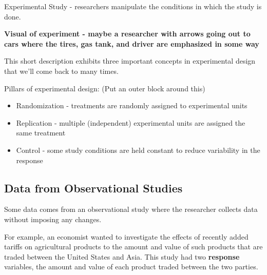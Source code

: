 \documentclass[
]{book}
\providecommand{\tightlist}{%
  \setlength{\itemsep}{0pt}\setlength{\parskip}{0pt}}
\theoremstyle{definition}
\theoremstyle{definition}
\theoremstyle{definition}
\theoremstyle{remark}
\let\BeginKnitrBlock\begin \let\EndKnitrBlock\end
\begin{document}
\BeginKnitrBlock{definition}
Experimental Study - researchers manipulate the conditions in which the study is done.
\EndKnitrBlock{definition}

\textbf{Visual of experiment - maybe a researcher with arrows going out to cars where the tires, gas tank, and driver are emphasized in some way}

This short description exhibits three important concepts in experimental design that we'll come back to many times.

Pillars of experimental design: (Put an outer block around this)

\BeginKnitrBlock{definition}
\begin{itemize}
\tightlist
\item
  Randomization - treatments are randomly assigned to experimental units\\
\end{itemize}
\EndKnitrBlock{definition}

\BeginKnitrBlock{definition}
\begin{itemize}
\tightlist
\item
  Replication - multiple (independent) experimental units are assigned the same treatment\\
\end{itemize}
\EndKnitrBlock{definition}

\BeginKnitrBlock{definition}
\begin{itemize}
\tightlist
\item
  Control - some study conditions are held constant to reduce variability in the response\\
\end{itemize}
\EndKnitrBlock{definition}

\hypertarget{data-from-observational-studies}{%
\subsection{Data from Observational Studies}\label{data-from-observational-studies}}

Some data comes from an observational study where the researcher collects data without imposing any changes.

For example, an economist wanted to investigate the effects of recently added tariffs on agricultural products to the amount and value of such products that are traded between the United States and Asia. This study had two \textbf{response} variables, the amount and value of each product traded between the two parties.
\end{document}
